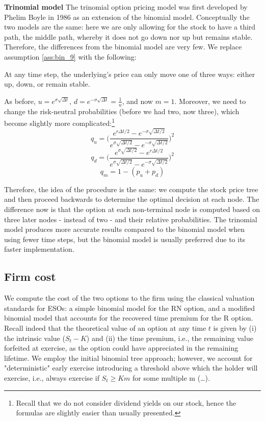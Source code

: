 \textbf{Trinomial model}
The trinomial option pricing model was  first developed by Phelim Boyle in 1986 as an extension of the binomial model. Conceptually the two models are the same: here we are only allowing for the stock to have a third path, the middle path, whereby it does not go down nor up but remains stable. Therefore, the differences from the binomial model are very few. We replace assumption \ref*{ass:bin_9} with the following:
\begin{assumption}
    \label{ass:trin_10}
    At any time step, the underlying's price can only move one of three ways: either up, down, or remain stable.
\end{assumption}
As before, $u = e^{\sigma \sqrt{\Delta t}}$, $d = e^{-\sigma \sqrt{\Delta t}}=\frac{1}{u}$, and now $m=1$. Moreover, we need to change the risk-neutral probabilities (before we had two, now three), which become slightly more complicated:\footnote{Recall that we do not consider dividend yields on our stock, hence the formulas are slightly easier than usually presented.}
$$ q_u = \Biggl(\frac{e^{r \Delta t / 2} - e^{-\sigma \sqrt{\Delta t / 2}}}{e^{\sigma \sqrt{\Delta t / 2}} - e^{-\sigma \sqrt{\Delta t / 2}}}\Biggr)^2 $$
$$ q_d = \Biggl(\frac{e^{\sigma \sqrt{\Delta t / 2}} - e^{r \Delta t / 2}}{e^{\sigma \sqrt{\Delta t / 2}} - e^{-\sigma \sqrt{\Delta t / 2}}}\Biggr)^2 $$
$$ q_m = 1 - (p_u + p_d) $$

Therefore, the idea of the procedure is the same: we compute the stock price tree and then proceed backwards to determine the optimal decision at each node. The difference now is that the option at each non-terminal node is computed based on three later nodes - instead of two - and their relative probabilities.
The trinomial model produces more accurate results compared to the binomial model when using fewer time steps, but the binomial model is usually preferred due to its faster implementation.

\subsection{Firm cost} 

We compute the cost of the two options to the firm using the classical valuation standards for ESOs: a simple binomial model for the RN option, and a modified binomial model that accounts for the recovered time premium for the R option.
Recall indeed that the theoretical value of an option at any time $t$ is given by (i) the intrinsic value ($S_t - K$) and (ii) the time premium, i.e., the remaining value forfeited at exercise, as the option could have appreciated in the remaining lifetime. 
We employ the \cite{cox1979option} initial binomial tree approach; however, we account for "deterministic" early exercise introducing a threshold above which the holder will exercise, i.e., always exercise if $S_t \ge Km$ for some multiple m (\dots).

